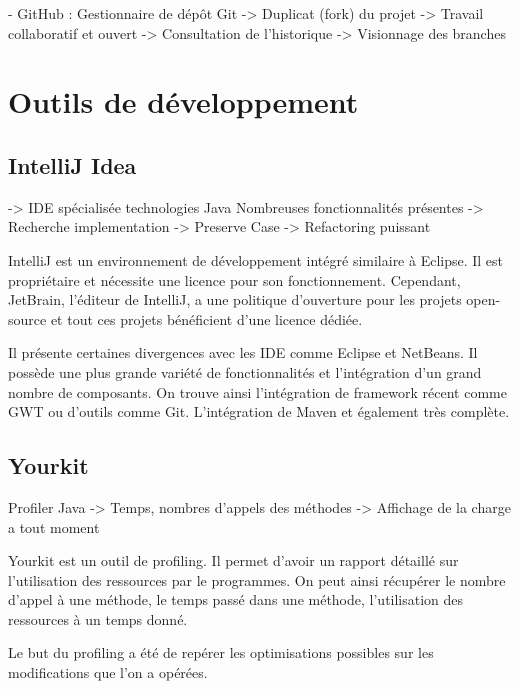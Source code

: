 - GitHub : Gestionnaire de dépôt Git
-> Duplicat (fork) du projet
-> Travail collaboratif et ouvert 
-> Consultation de l'historique
-> Visionnage des branches



\section{Outils de développement}
\subsection{IntelliJ Idea}
-> IDE spécialisée technologies Java
Nombreuses fonctionnalités présentes
-> Recherche implementation 
-> Preserve Case
-> Refactoring puissant

IntelliJ est un environnement de développement intégré similaire à Eclipse. Il est propriétaire et nécessite une licence pour son fonctionnement. Cependant, JetBrain, l'éditeur de IntelliJ, a une politique d'ouverture pour les projets open-source et tout ces projets bénéficient d'une licence dédiée.

Il présente certaines divergences avec les IDE comme Eclipse et NetBeans. Il possède une plus grande variété de fonctionnalités et l'intégration d'un grand nombre de composants. On trouve ainsi l'intégration de framework récent comme GWT ou d'outils comme Git. L'intégration de Maven et également très complète.
\subsection{Yourkit}
Profiler Java
-> Temps, nombres d'appels des méthodes
-> Affichage de la charge a tout moment

Yourkit est un outil de profiling. Il permet d'avoir un rapport détaillé sur l'utilisation des ressources par le programmes. On peut ainsi récupérer le nombre d'appel à une méthode, le temps passé dans une méthode, l'utilisation des ressources à un temps donné.

Le but du profiling a été de repérer les optimisations possibles sur les modifications que l'on a opérées.